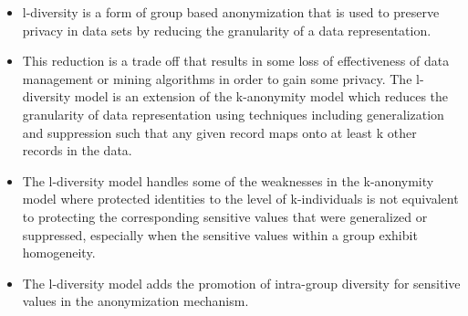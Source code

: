 \begin{itemize}
\item l-diversity is a form of group based anonymization that is used to preserve privacy in data sets by reducing the granularity of a data representation.
\item This reduction is a trade off that results in some loss of effectiveness of data management or mining algorithms in order to gain some privacy. The l-diversity model is an extension of the k-anonymity model which reduces the granularity of data representation using techniques including generalization and suppression such that any given record maps onto at least k other records in the data. 
\item The l-diversity model handles some of the weaknesses in the k-anonymity model where protected identities to the level of k-individuals is not equivalent to protecting the corresponding sensitive values that were generalized or suppressed, especially when the sensitive values within a group exhibit homogeneity. 
\item The l-diversity model adds the promotion of intra-group diversity for sensitive values in the anonymization mechanism.
\end{itemize}
